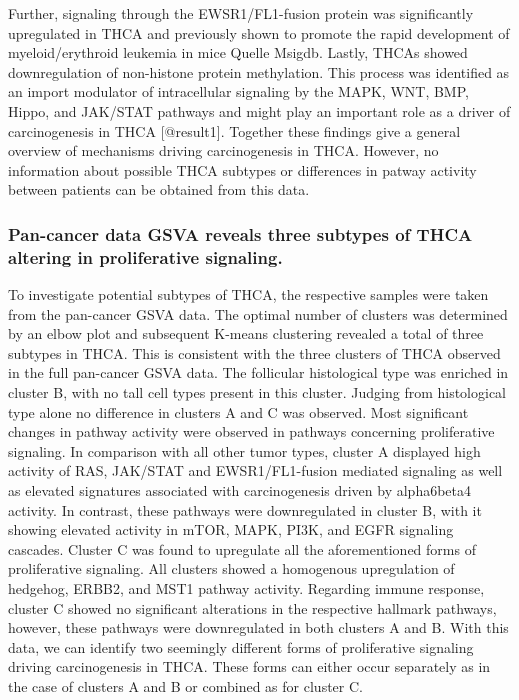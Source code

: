 \documentclass[
]{article}
\begin{document}
Further, signaling through the EWSR1/FL1-fusion protein was
significantly upregulated in THCA and previously shown to promote the
rapid development of myeloid/erythroid leukemia in mice Quelle Msigdb.
Lastly, THCAs showed downregulation of non-histone protein methylation.
This process was identified as an import modulator of intracellular
signaling by the MAPK, WNT, BMP, Hippo, and JAK/STAT pathways and might
play an important role as a driver of carcinogenesis in THCA
{[}@result1{]}. Together these findings give a general overview of
mechanisms driving carcinogenesis in THCA. However, no information about
possible THCA subtypes or differences in patway activity between
patients can be obtained from this data.

\hypertarget{pan-cancer-data-gsva-reveals-three-subtypes-of-thca-altering-in-proliferative-signaling.}{%
\subsubsection{Pan-cancer data GSVA reveals three subtypes of THCA
altering in proliferative
signaling.}\label{pan-cancer-data-gsva-reveals-three-subtypes-of-thca-altering-in-proliferative-signaling.}}

To investigate potential subtypes of THCA, the respective samples were
taken from the pan-cancer GSVA data. The optimal number of clusters was
determined by an elbow plot and subsequent K-means clustering revealed a
total of three subtypes in THCA. This is consistent with the three
clusters of THCA observed in the full pan-cancer GSVA data. The
follicular histological type was enriched in cluster B, with no tall
cell types present in this cluster. Judging from histological type alone
no difference in clusters A and C was observed. Most significant changes
in pathway activity were observed in pathways concerning proliferative
signaling. In comparison with all other tumor types, cluster A displayed
high activity of RAS, JAK/STAT and EWSR1/FL1-fusion mediated signaling
as well as elevated signatures associated with carcinogenesis driven by
alpha6beta4 activity. In contrast, these pathways were downregulated in
cluster B, with it showing elevated activity in mTOR, MAPK, PI3K, and
EGFR signaling cascades. Cluster C was found to upregulate all the
aforementioned forms of proliferative signaling. All clusters showed a
homogenous upregulation of hedgehog, ERBB2, and MST1 pathway activity.
Regarding immune response, cluster C showed no significant alterations
in the respective hallmark pathways, however, these pathways were
downregulated in both clusters A and B. With this data, we can identify
two seemingly different forms of proliferative signaling driving
carcinogenesis in THCA. These forms can either occur separately as in
the case of clusters A and B or combined as for cluster C.
\end{document}
